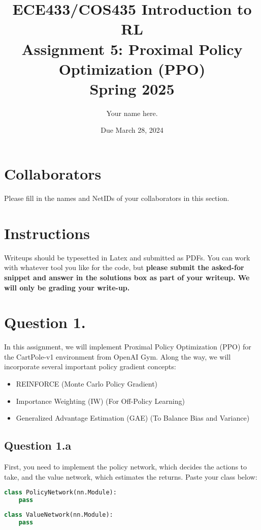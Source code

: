 \documentclass[12pt]{article}
\date{Due March 28, 2024}
\author{\begin{fillme}[width=0.3\textwidth]
 Your name here.
\end{fillme}} %
\title{ECE433/COS435 Introduction to RL\\
  Assignment 5: Proximal Policy Optimization (PPO)
\\
  Spring 2025\\
}
\begin{document}
  \maketitle
  \section*{Collaborators}
\begin{fillme}
 Please fill in the names and NetIDs of your collaborators in this section.
\end{fillme}

\section*{Instructions}

Writeups should be typesetted in Latex and submitted as PDFs. You can work with whatever tool you like for the code, but \textbf{please submit the asked-for snippet and answer in the solutions box as part of your writeup. We will only be grading your write-up.}

\section*{Question 1.}

In this assignment, we will implement Proximal Policy Optimization (PPO) for the CartPole-v1 environment from OpenAI Gym. Along the way, we will incorporate several important policy gradient concepts:

\begin{itemize}
    \item REINFORCE (Monte Carlo Policy Gradient)
    \item Importance Weighting (IW) (For Off-Policy Learning)
    \item Generalized Advantage Estimation (GAE) (To Balance Bias and Variance)
\end{itemize}




\subsection*{Question 1.a} 
First, you need to implement the policy network, which decides the actions to take, and the value network, which estimates the returns.
Paste your class below:
\begin{solution}
\begin{lstlisting}[language=Python]
class PolicyNetwork(nn.Module):
    pass
\end{lstlisting}
\begin{lstlisting}[language=Python]
class ValueNetwork(nn.Module):
    pass
\end{lstlisting}
\end{solution}
\end{document}
